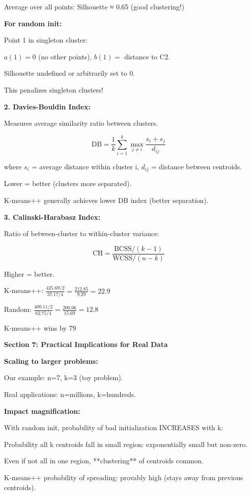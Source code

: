 \documentclass[12pt]{article}
\begin{document}
\begin{explanation}
Average over all points: Silhouette ≈ 0.65 (good clustering!)

\textbf{For random init:}

Point 1 in singleton cluster:

$a(1) = 0$ (no other points), $b(1) = $ distance to C2.

Silhouette undefined or arbitrarily set to 0.

This penalizes singleton clusters!

\textbf{2. Davies-Bouldin Index:}

Measures average similarity ratio between clusters.

\[
\text{DB} = \frac{1}{k}\sum_{i=1}^k \max_{j \neq i} \frac{s_i + s_j}{d_{ij}}
\]

where $s_i$ = average distance within cluster i, $d_{ij}$ = distance between centroids.

Lower = better (clusters more separated).

K-means++ generally achieves lower DB index (better separation).

\textbf{3. Calinski-Harabasz Index:}

Ratio of between-cluster to within-cluster variance:

\[
\text{CH} = \frac{\text{BCSS}/(k-1)}{\text{WCSS}/(n-k)}
\]

Higher = better.

K-means++: $\frac{425.69/2}{37.17/4} = \frac{212.85}{9.29} = 22.9$

Random: $\frac{400.11/2}{62.75/4} = \frac{200.06}{15.69} = 12.8$

K-means++ wins by 79%

\textbf{Section 7: Practical Implications for Real Data}

\textbf{Scaling to larger problems:}

Our example: n=7, k=3 (toy problem).

Real applications: n=millions, k=hundreds.

\textbf{Impact magnification:}

With random init, probability of bad initialization INCREASES with k:

Probability all k centroids fall in small region: exponentially small but non-zero.

Even if not all in one region, **clustering** of centroids common.

K-means++ probability of spreading: provably high (stays away from previous centroids).


\end{explanation}
\end{document}
